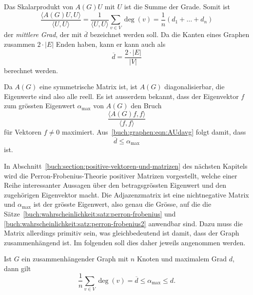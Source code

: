 Das Skalarprodukt von $A(G)U$ mit $U$ ist die Summe der Grade.
Somit ist
\begin{equation}
\frac{\langle A(G)U,U\rangle}{\langle U,U\rangle}
=
\frac{1}{\langle U,U\rangle}\sum_{v\in V}\deg(v)
=
\frac{1}{n}(d_1+\dots+d_n)
\label{buch:graphen:eqn:AUdavg}
\end{equation}
der {\em mittlere Grad}, der mit $\overline{d}$ bezeichnet werden soll.
Da die Kanten eines Graphen zusammen $2\cdot|E|$ Enden haben, kann
er kann auch als
\[
\overline{d}=\frac{2\cdot|E|}{|V|}
\]
berechnet werden.
%

Da $A(G)$ eine symmetrische Matrix ist, ist $A(G)$ diagonalisierbar,
die Eigenwerte sind also alle reell.
Es ist ausserdem bekannt, dass der Eigenvektor $f$ zum grössten Eigenwert
$\alpha_{\text{max}}$ von $A(G)$
den Bruch
\[
\frac{\langle A(G)f,f\rangle}{\langle f,f\rangle}
\]
für Vektoren $f\ne 0$ maximiert.
Aus~\eqref{buch:graphen:eqn:AUdavg} folgt damit, dass
\begin{equation}
\overline{d}
\le
\alpha_{\text{max}}
\label{buch:graphen:eqn:dqueramax}
\end{equation}
ist.

In Abschnitt~\ref{buch:section:positive-vektoren-und-matrizen}
des nächsten Kapitels wird die Perron-Frobenius-Theorie positiver
%
%
Matrizen vorgestellt, welche einer Reihe interessanter Aussagen
über den betragsgrössten Eigenwert und den zugehörigen Eigenvektor
macht.
Die Adjazenzmatrix ist eine nichtnegative Matrix und $\alpha_{\text{max}}$
ist der grösste Eigenwert, also genau die Grösse, auf die die
Sätze~\ref{buch:wahrscheinlichkeit:satz:perron-frobenius}
und \ref{buch:wahrscheinlichkeit:satz:perron-frobenius2}
anwendbar sind.
Dazu muss die Matrix allerdings primitiv sein, was gleichbedeutend
%
ist damit, dass der Graph zusammenhängend ist.
Im folgenden soll dies daher jeweils angenommen werden.

\begin{satz}
Ist $G$ ein zusammenhängender Graph mit $n$ Knoten und maximalem Grad $d$,
dann gilt
\[
\frac1n\sum_{v\in V} \deg(v) 
=
\overline{d}
\le \alpha_{\text{max}} \le d.
\]
\end{satz}

